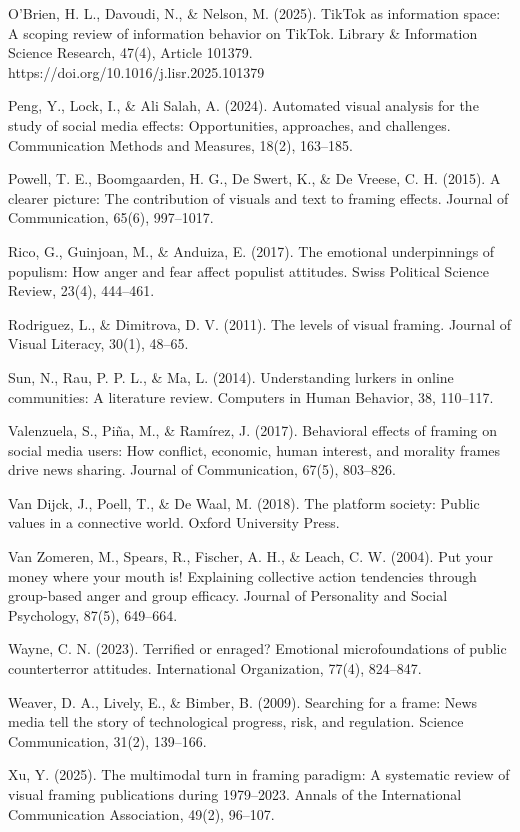 \documentclass[
]{article}
\begin{document}
O'Brien, H. L., Davoudi, N., \& Nelson, M. (2025). TikTok as information
space: A scoping review of information behavior on TikTok. Library \&
Information Science Research, 47(4), Article 101379.
https://doi.org/10.1016/j.lisr.2025.101379

Peng, Y., Lock, I., \& Ali Salah, A. (2024). Automated visual analysis
for the study of social media effects: Opportunities, approaches, and
challenges. Communication Methods and Measures, 18(2), 163--185.

Powell, T. E., Boomgaarden, H. G., De Swert, K., \& De Vreese, C. H.
(2015). A clearer picture: The contribution of visuals and text to
framing effects. Journal of Communication, 65(6), 997--1017.

Rico, G., Guinjoan, M., \& Anduiza, E. (2017). The emotional
underpinnings of populism: How anger and fear affect populist attitudes.
Swiss Political Science Review, 23(4), 444--461.

Rodriguez, L., \& Dimitrova, D. V. (2011). The levels of visual framing.
Journal of Visual Literacy, 30(1), 48--65.

Sun, N., Rau, P. P. L., \& Ma, L. (2014). Understanding lurkers in
online communities: A literature review. Computers in Human Behavior,
38, 110--117.

Valenzuela, S., Piña, M., \& Ramírez, J. (2017). Behavioral effects of
framing on social media users: How conflict, economic, human interest,
and morality frames drive news sharing. Journal of Communication, 67(5),
803--826.

Van Dijck, J., Poell, T., \& De Waal, M. (2018). The platform society:
Public values in a connective world. Oxford University Press.

Van Zomeren, M., Spears, R., Fischer, A. H., \& Leach, C. W. (2004). Put
your money where your mouth is! Explaining collective action tendencies
through group-based anger and group efficacy. Journal of Personality and
Social Psychology, 87(5), 649--664.

Wayne, C. N. (2023). Terrified or enraged? Emotional microfoundations of
public counterterror attitudes. International Organization, 77(4),
824--847.

Weaver, D. A., Lively, E., \& Bimber, B. (2009). Searching for a frame:
News media tell the story of technological progress, risk, and
regulation. Science Communication, 31(2), 139--166.

Xu, Y. (2025). The multimodal turn in framing paradigm: A systematic
review of visual framing publications during 1979--2023. Annals of the
International Communication Association, 49(2), 96--107.
\end{document}
